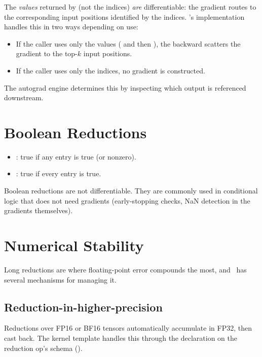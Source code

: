 The \emph{values} returned by  (not the indices)
\emph{are} differentiable: the gradient routes to the corresponding
input positions identified by the indices. \Lucid's 
implementation handles this in two ways depending on use:

\begin{itemize}
  \item If the caller uses only the values
    ( and then ),
    the backward scatters the gradient to the top-\(k\) input
    positions.
  \item If the caller uses only the indices, no gradient is
    constructed.
\end{itemize}

The autograd engine determines this by inspecting which output is
referenced downstream.

\section{Boolean Reductions}
\label{sec:reductions:boolean}

\begin{itemize}
  \item {}: true if any entry is true (or nonzero).
  \item {}: true if every entry is true.
\end{itemize}

Boolean reductions are not differentiable. They are commonly used
in conditional logic that does not need gradients (early-stopping
checks, NaN detection in the gradients themselves).

\section{Numerical Stability}
\label{sec:reductions:stability}

Long reductions are where floating-point error compounds the most,
and \Lucid\ has several mechanisms for managing it.

\subsection{Reduction-in-higher-precision}
\label{ssec:reductions:higher_precision}

Reductions over FP16 or BF16 tensors automatically accumulate in
FP32, then cast back. The kernel template handles this through the
 declaration on the reduction op's
schema ().

